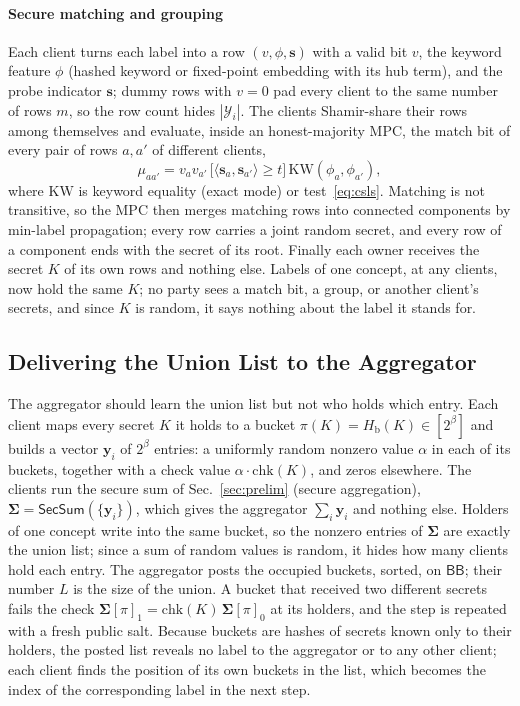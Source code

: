 \paragraph{Secure matching and grouping}
Each client turns each label into a row $(v,\phi,\mathbf{s})$ with a valid bit $v$, the keyword
feature $\phi$ (hashed keyword or fixed-point embedding with its hub term), and the probe
indicator $\mathbf{s}$; dummy rows with $v=0$ pad every client to the same number of rows $m$, so the
row count hides $|\mathcal{Y}_i|$. The clients Shamir-share their rows among themselves and evaluate,
inside an honest-majority MPC, the match bit of every pair of rows $a,a'$ of different clients,
\begin{equation}
  \mu_{aa'} = v_a v_{a'}\,\big[\langle\mathbf{s}_a,\mathbf{s}_{a'}\rangle\ge t\big]\,
  \mathrm{KW}(\phi_a,\phi_{a'}),
\end{equation}
where $\mathrm{KW}$ is keyword equality (exact mode) or test~\eqref{eq:csls}. Matching
is not transitive, so the MPC then merges matching rows into connected components by min-label
propagation; every row carries a joint random secret, and every row of a component ends with the
secret of its root. Finally each owner receives the secret $K$ of its own rows and nothing else.
Labels of one concept, at any clients, now hold the same $K$; no party sees a match bit, a group, or
another client's secrets, and since $K$ is random, it says nothing about the label it stands for.

\subsection{Delivering the Union List to the Aggregator}
\label{sec:union-secsum}

The aggregator should learn the union list but not who holds which entry. Each client maps every
secret $K$ it holds to a bucket $\pi(K)=H_{\mathrm b}(K)\in[2^\beta]$ and builds a vector
$\mathbf{y}_i$ of $2^\beta$ entries: a uniformly random nonzero value $\alpha$ in each of its buckets,
together with a check value $\alpha\cdot\mathrm{chk}(K)$, and zeros elsewhere. The clients run the
secure sum of Sec.~\ref{sec:prelim} (secure aggregation), $\boldsymbol\Sigma=\mathsf{SecSum}(\{\mathbf{y}_i\})$,
which gives the aggregator $\sum_i\mathbf{y}_i$ and nothing else. Holders of one concept write into
the same bucket, so the nonzero entries of $\boldsymbol\Sigma$ are exactly the union list; since a sum
of random values is random, it hides how many clients hold each entry. The aggregator posts the
occupied buckets, sorted, on $\mathsf{BB}$; their number $L$ is the size of the union. A bucket that
received two different secrets fails the check $\boldsymbol\Sigma[\pi]_1=\mathrm{chk}(K)\,
\boldsymbol\Sigma[\pi]_0$ at its holders, and the step is repeated with a fresh public salt. Because
buckets are hashes of secrets known only to their holders, the posted list reveals no label to the
aggregator or to any other client; each client finds the position of its own buckets in the list,
which becomes the index of the corresponding label in the next step.
